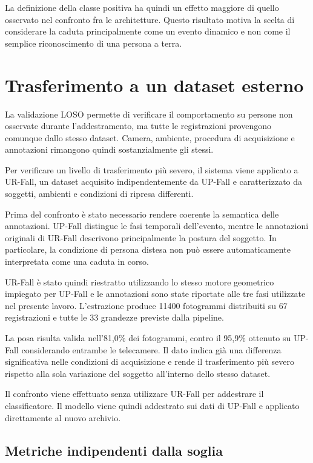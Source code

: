 La definizione della classe positiva ha quindi un effetto maggiore di quello osservato nel confronto fra le architetture. Questo risultato motiva la scelta di considerare la caduta principalmente come un evento dinamico e non come il semplice riconoscimento di una persona a terra.

\section{Trasferimento a un dataset esterno}
\label{sec:domainshift}

La validazione LOSO permette di verificare il comportamento su persone non osservate durante l'addestramento, ma tutte le registrazioni provengono comunque dallo stesso dataset. Camera, ambiente, procedura di acquisizione e annotazioni rimangono quindi sostanzialmente gli stessi.

Per verificare un livello di trasferimento più severo, il sistema viene applicato a UR-Fall, un dataset acquisito indipendentemente da UP-Fall e caratterizzato da soggetti, ambienti e condizioni di ripresa differenti.

Prima del confronto è stato necessario rendere coerente la semantica delle annotazioni. UP-Fall distingue le fasi temporali dell'evento, mentre le annotazioni originali di UR-Fall descrivono principalmente la postura del soggetto. In particolare, la condizione di persona distesa non può essere automaticamente interpretata come una caduta in corso.

UR-Fall è stato quindi riestratto utilizzando lo stesso motore geometrico impiegato per UP-Fall e le annotazioni sono state riportate alle tre fasi utilizzate nel presente lavoro. L'estrazione produce 11400 fotogrammi distribuiti su 67 registrazioni e tutte le 33 grandezze previste dalla pipeline.

La posa risulta valida nell'81,0\% dei fotogrammi, contro il 95,9\% ottenuto su UP-Fall considerando entrambe le telecamere. Il dato indica già una differenza significativa nelle condizioni di acquisizione e rende il trasferimento più severo rispetto alla sola variazione del soggetto all'interno dello stesso dataset.

Il confronto viene effettuato senza utilizzare UR-Fall per addestrare il classificatore. Il modello viene quindi addestrato sui dati di UP-Fall e applicato direttamente al nuovo archivio.

\subsection{Metriche indipendenti dalla soglia}
\label{sec:prauc}

